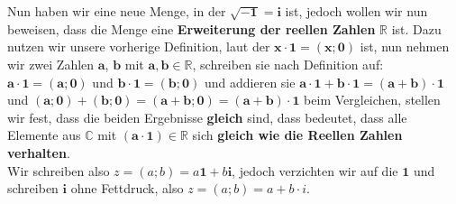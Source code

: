 \parbox{0.9\textwidth}
{
    Nun haben wir eine neue Menge, in der $\mathbf{\sqrt{-1} = i}$ ist, jedoch
    wollen wir nun beweisen, dass die Menge eine \textbf{Erweiterung der reellen Zahlen} $\mathbb{R}$ ist.
    Dazu nutzen wir unsere vorherige Definition, laut der $\mathbf{x \cdot 1 = \left(x; 0\right)}$ ist,
    nun nehmen wir zwei Zahlen $\mathbf{a}$, $\mathbf{b}$ mit $\mathbf{a, b \in \mathbb{R}}$, schreiben
    sie nach Definition auf: $\mathbf{a \cdot 1 = \left(a; 0\right)}$ und $\mathbf{b \cdot 1 = \left(b; 0\right)}$
    und addieren sie $\mathbf{a \cdot 1 + b \cdot 1 = \left(a + b\right) \cdot 1}$ und
    $\mathbf{\left(a; 0\right) + \left(b; 0\right) = \left(a + b; 0\right) = \left(a + b\right) \cdot 1}$
    beim Vergleichen, stellen wir fest, dass die beiden Ergebnisse \textbf{gleich} sind, dass bedeutet,
    dass alle Elemente aus $\mathbf{\mathbb{C}}$ mit $\mathbf{(a \cdot 1) \in \mathbb{R}}$ sich \textbf{gleich wie
    die Reellen Zahlen verhalten}. \\

    Wir schreiben also $z=(a;b)=a\mathbf{1}+b\mathbf{i}$, jedoch verzichten wir auf
    die $\mathbf{1}$ und schreiben $\mathbf{i}$ ohne Fettdruck, also $z = (a;b) = a + b \cdot i$.
}